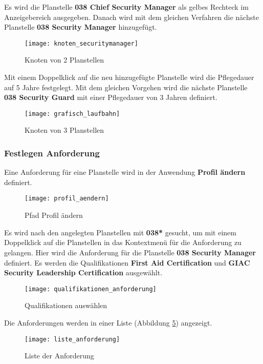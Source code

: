 Es wird die Planstelle \textbf{038 Chief Security Manager} als gelbes Rechteck im Anzeigebereich ausgegeben. Danach wird mit dem gleichen Verfahren die nächste Planstelle \textbf{038 Security Manager} hinzugefügt.
\begin{figure}[H]
	\centering
	\texttt{[image: knoten\_securitymanager]}
	\caption{Knoten von 2 Planstellen}
	\label{fig:knoten_securitymanager}
\end{figure}
Mit einem Doppelklick auf die neu hinzugefügte Planstelle wird die Pflegedauer auf 5 Jahre festgelegt. Mit dem gleichen Vorgehen wird die nächste Planstelle \textbf{038 Security Guard} mit einer Pflegedauer von 3 Jahren definiert.
\begin{figure}[H]
	\centering
	\texttt{[image: grafisch\_laufbahn]}
	\caption{Knoten von 3 Planstellen}
	\label{fig:grafisch_laufbahn}
\end{figure}

\subsubsection{Festlegen Anforderung}
Eine Anforderung für eine Planstelle wird in der Anwendung \textbf{Profil ändern} definiert.
\begin{figure}[H]
	\centering
	\texttt{[image: profil\_aendern]}
	\caption{Pfad Profil ändern}
	\label{fig:profil_aendern}
\end{figure}
Es wird nach den angelegten Planstellen mit \textbf{038*} gesucht, um mit einem Doppelklick auf die Planstellen in das Kontextmenü für die Anforderung zu gelangen. Hier wird die Anforderung für die Planstelle \textbf{038 Security Manager} definiert. Es werden die Qualifikationen \textbf{First Aid Certification} und \textbf{GIAC Security Leadership Certification} ausgewählt.
\begin{figure}[H]
	\centering
	\texttt{[image: qualifikationen\_anforderung]}
	\caption{Qualifikationen auswählen}
	\label{fig:qualifikationen_anforderung}
\end{figure}
Die Anforderungen werden in einer Liste (Abbildung \ref{fig:liste_anforderung}) angezeigt.
\begin{figure}[H]
	\centering
	\texttt{[image: liste\_anforderung]}
	\caption{Liste der Anforderung}
	\label{fig:liste_anforderung}
\end{figure}


